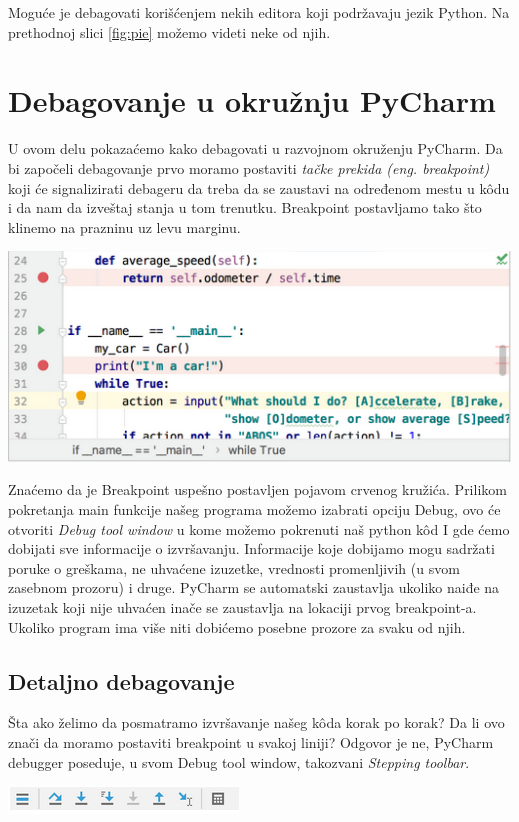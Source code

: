 \documentclass[a4paper]{article}
\begin{document}
Moguće je debagovati korišćenjem nekih editora koji podržavaju jezik Python. Na prethodnoj slici \ref{fig:pie} možemo videti neke od njih.

\section{Debagovanje u okružnju PyCharm}
U ovom delu pokazaćemo kako debagovati u razvojnom okruženju PyCharm. Da bi započeli debagovanje prvo moramo postaviti \emph{tačke prekida (eng. breakpoint)} koji će signalizirati debageru  da treba da se zaustavi na određenom mestu u k\^{o}du i da nam da izveštaj stanja u tom trenutku. Breakpoint postavljamo tako što klinemo na prazninu uz levu marginu.

\includegraphics[scale = 0.4]{1}

Znaćemo da je Breakpoint uspešno postavljen pojavom crvenog kružića\cite{pyCharm}. Prilikom pokretanja main funkcije našeg programa možemo izabrati opciju Debug, ovo će otvoriti \emph{Debug tool window} u kome možemo pokrenuti naš python k\^{o}d I gde ćemo dobijati sve informacije o izvršavanju. Informacije koje dobijamo mogu sadržati poruke o greškama, ne uhvaćene izuzetke, vrednosti promenljivih (u svom zasebnom prozoru) i druge\cite{pyCharm}. PyCharm se automatski zaustavlja ukoliko naiđe na izuzetak koji nije uhvaćen inače se zaustavlja na lokaciji prvog breakpoint-a\cite{pyCharm}. Ukoliko program ima više niti dobićemo posebne prozore za svaku od njih\cite{pyCharm}.
\subsection{Detaljno debagovanje}
Šta ako želimo da posmatramo izvršavanje našeg k\^{o}da korak po korak? Da li ovo znači da moramo postaviti breakpoint u svakoj liniji? Odgovor je ne, PyCharm debugger poseduje, u svom Debug tool window, takozvani \emph{Stepping toolbar}.

\includegraphics[scale = 0.6]{2}
\end{document}
